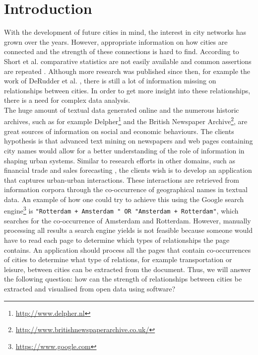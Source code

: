\section{Introduction}
With the development of future cities in mind, the interest in city networks has grown over the years. However, appropriate information on how cities are connected and the strength of these connections is hard to find. According to Short et al. comparative statistics are not easily available and common assertions are repeated \cite{short1996dirty}. Although more research was published since then, for example the work of DeRudder et al. \cite{derudder2005appraisal}, there is still a lot of information missing on relationships between cities.
 In order to get more insight into these relationships, there is a need for complex data analysis. \\

The huge amount of textual data generated online and the numerous historic archives, such as for example Delpher\footnote{\url{http://www.delpher.nl}} and the British Newspaper Archive\footnote{\url{http://www.britishnewspaperarchive.co.uk/}}, are great sources of information on social and economic behaviours. The clients hypothesis is that advanced text mining on newspapers and web pages containing city names would allow for a better understanding of the role of information in shaping urban systems. Similar to research efforts in other domains, such as financial trade \cite{preis2013quantifying} and sales forecasting \cite{wu2014future}, the clients wish is to develop an application that captures urban-urban interactions. These interactions are retrieved from information corpora through the co-occurrence of geographical names in textual data. An example of how one could try to achieve this using  the Google search engine\footnote{\url{https://www.google.com}} is \texttt{"Rotterdam + Amsterdam " OR "Amsterdam + Rotterdam"}, which searches for the co-occurrence of Amsterdam and Rotterdam. However, manually processing all results a search engine yields is not feasible because someone would have to read each page to determine which types of relationships the page contains. An application should process all the pages that contain co-occurrences of cities to determine what type of relations, for example transportation or leisure, between cities can be extracted from the document. Thus, we will answer the following question: 
how can the strength of relationships between cities be extracted and visualised from open data using software? \\

